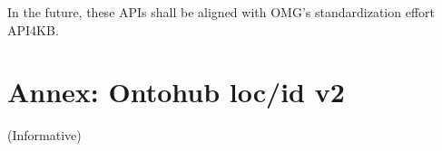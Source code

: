 \documentclass[10pt,fleqn,final]{scrreprt}
\newcommand{\informative}[0]{{\begin{center}{\Large{(Informative})}\end{center}} \bigskip}
\newcommand{\infannex}[1]{ \chapter{Annex: #1}  \informative }
\begin{document}
In the future, these APIs shall be aligned with OMG's standardization
effort API4KB.


\infannex{Ontohub loc/id v2}\label{a:loc/id}



\lstset{ %
  basicstyle=\small\ttfamily,
  breakatwhitespace=true,         %
  breaklines=true,                 %
  captionpos=b,                    %
  extendedchars=true,              %
  frame=single,                    %
  keepspaces=true,                 %
  numbersep=5pt,                   %
}


\newenvironment{oitemize}{%
  \renewcommand{\labelitemii}{$\bullet$}%
  \vspace{-15pt}
  \begin{itemize}}
  {\end{itemize}}
\end{document}
